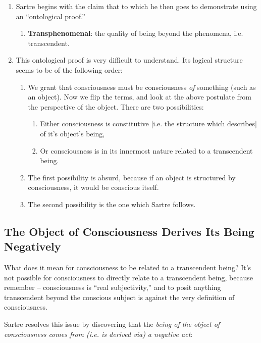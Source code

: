 \begin{enumerate}
  \item Sartre begins with the claim that  to which he then goes to demonstrate using an \enquote{ontological proof.}
  \begin{enumerate}
    \item \textbf{Transphenomenal}: the quality of being beyond the phenomena, i.e. transcendent.
  \end{enumerate}
  \item This ontological proof is very difficult to understand. Its logical structure seems to be of the following order:
  \begin{enumerate}
    \item We grant that consciousness must be consciousness \emph{of} something (such as an object). Now we flip the terms, and look at the above postulate from the perspective of the object. There are two possibilities:
    \begin{enumerate}
      \item Either consciousness is constitutive [i.e. the structure which describes] of it's object's being,
      \item Or consciousness is in its innermost nature related to a transcendent being.
    \end{enumerate}
    \item The first possibility is absurd, because if an object is structured by consciousness, it would be conscious itself.
    \item The second possibility is the one which Sartre follows.
  \end{enumerate}
\end{enumerate}

\subsection{The Object of Consciousness Derives Its Being Negatively}
What does it mean for consciousness to be related to a transcendent being? It's not possible for consciousness to directly relate to a transcendent being, because remember -- consciousness is \enquote{real subjectivity,} and to posit anything transcendent beyond the conscious subject is against the very definition of consciousness.

\noindent
Sartre resolves this issue by discovering that the \emph{being of the object of consciousness comes from (i.e. is derived via) a negative act}:

